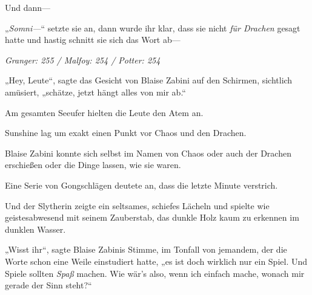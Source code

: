 Und dann—

„\emph{Somni—}“ setzte sie an, dann wurde ihr klar, dass sie nicht \emph{für Drachen} gesagt hatte und hastig schnitt sie sich das Wort ab—

\later

\emph{Granger: 255 / Malfoy: 254 / Potter: 254}

„Hey, Leute“, sagte das Gesicht von Blaise Zabini auf den Schirmen, sichtlich amüsiert, „schätze, jetzt hängt alles von mir ab.“

Am gesamten Seeufer hielten die Leute den Atem an.

Sunshine lag um exakt einen Punkt vor Chaos und den Drachen.

Blaise Zabini konnte sich selbst im Namen von Chaos oder auch der Drachen erschießen oder die Dinge lassen, wie sie waren.

Eine Serie von Gongschlägen deutete an, dass die letzte Minute verstrich.

Und der Slytherin zeigte ein seltsames, schiefes Lächeln und spielte wie geistesabwesend mit seinem Zauberstab, das dunkle Holz kaum zu erkennen im dunklen Wasser.

„Wisst ihr“, sagte Blaise Zabinis Stimme, im Tonfall von jemandem, der die Worte schon eine Weile einstudiert hatte, „es ist doch wirklich nur ein Spiel. Und Spiele sollten \emph{Spaß} machen. Wie wär’s also, wenn ich einfach mache, wonach mir gerade der Sinn steht?“

